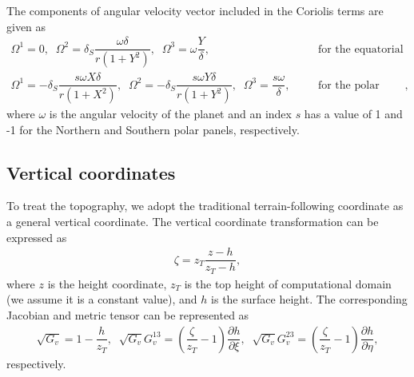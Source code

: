 The components of angular velocity vector included in the Coriolis terms
are given as
\begin{align}
  \Omega^1 = 0, \;\;
  \Omega^2 = \delta_S \dfrac{\omega \delta}{r(1+Y^2)}, \;\;
  \Omega^3 = \omega \dfrac{Y}{\delta}, \;\;\;\;\;\; &\text{for the equatorial panels,} \nonumber \\
  \Omega^1 = - \delta_S \dfrac{s\omega X\delta}{r(1+X^2)}, \;\;
  \Omega^2 = - \delta_S \dfrac{s\omega Y\delta}{r(1+Y^2)}, \;\;
  \Omega^3 = \dfrac{s\omega}{\delta}, \;\;\;\;\;\;  &\text{for the polar panels}, 
\end{align}
where 
$\omega$ is the angular velocity of the planet
and an index $s$ has a value of 1 and -1 for the Northern and Southern polar panels, respectively. 


\subsection{Vertical coordinates}
To treat the topography, 
we adopt the traditional terrain-following coordinate \citep{PHILLIPS1957,GALCHEN1975209} as a general vertical coordinate. 
The vertical coordinate transformation can be expressed as 
\begin{align}
    \zeta = z_T \dfrac{z-h}{z_T - h},   
\end{align}
where
$z$ is the height coordinate, 
$z_T$ is the top height of computational domain (we assume it is a constant value), 
and $h$ is the surface height. 
The corresponding Jacobian and metric tensor can be represented as   
\begin{align}
     \sqrt{G_v} = 1 - \dfrac{h}{z_T}, \;\;
    \sqrt{G_v} G_v^{13} = \left(\dfrac{\zeta}{z_T} - 1 \right) \dfrac{\partial h}{\partial \xi}, \;\;     
    \sqrt{G_v} G_v^{23} = \left(\dfrac{\zeta}{z_T} - 1 \right) \dfrac{\partial h}{\partial \eta}, 
\end{align}
respectively. 



